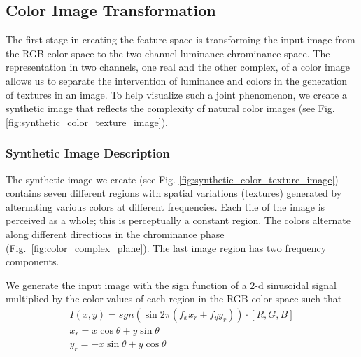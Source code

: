 \subsection{Color Image Transformation}
The first stage in creating the feature space is transforming the input image from the RGB color space to the two-channel luminance-chrominance space. The representation in two channels, one real and the other complex, of a color image allows us to separate the intervention of luminance and colors in the generation of textures in an image. To help visualize such a joint phenomenon, we create a synthetic image that reflects the complexity of natural color images (see Fig. \ref{fig:synthetic_color_texture_image}).

\subsubsection{Synthetic Image Description}
The synthetic image we create (see Fig. \ref{fig:synthetic_color_texture_image}) contains seven different regions with spatial variations (textures) generated by alternating various colors at different frequencies. Each tile of the image is perceived as a whole; this is perceptually a constant region. The colors alternate along different directions in the chrominance phase (Fig.\ \ref{fig:color_complex_plane}). The last image region has two frequency components.

We generate the input image with the sign function of a 2-d sinusoidal signal multiplied by the color values of each region in the RGB color space such that
\begin{gather}
	I(x, y) = sgn( \sin 2 \pi (f_x x_r + f_y y_r)) \cdot [R, G, B]\label{eq:2D_squared_signal}\\
	x_r = x \cos\theta + y \sin\theta \nonumber \\
    y_r = -x \sin\theta + y \cos\theta \nonumber  
\end{gather}


